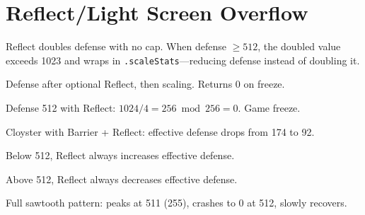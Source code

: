 \chapter{Reflect/Light Screen Overflow}\label{ch:reflect}

Reflect doubles defense with no cap. When defense $\ge 512$, the doubled value
exceeds 1023 and wraps in \texttt{.scaleStats}---reducing defense instead of doubling it.

\begin{definition}\label{def:effective_defense}
  \leanok
  Defense after optional Reflect, then scaling. Returns 0 on freeze.
\end{definition}

\begin{theorem}\label{thm:reflect_freezes}
  \leanok
  Defense 512 with Reflect: $1024/4 = 256 \bmod 256 = 0$. Game freeze.
\end{theorem}

\begin{theorem}\label{thm:reflect_hurts_cloyster}
  \leanok
  Cloyster with Barrier + Reflect: effective defense drops from 174 to 92.
\end{theorem}

\begin{theorem}\label{thm:reflect_helps_below}
  \leanok
  Below 512, Reflect always increases effective defense.
\end{theorem}

\begin{theorem}\label{thm:reflect_hurts_above}
  \leanok
  Above 512, Reflect always decreases effective defense.
\end{theorem}

\begin{theorem}\label{thm:reflect_sawtooth}
  \leanok
  Full sawtooth pattern: peaks at 511 (255), crashes to 0 at 512, slowly recovers.
\end{theorem}

